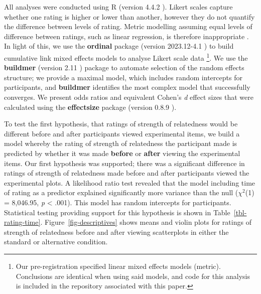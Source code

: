 \documentclass[manuscript,screen,review,anonymous]{acmart}
\begin{document}
All analyses were conducted using R (version 4.4.2 \citep{rcore}).
Likert scales capture whether one rating is higher or lower than
another, however they do not quantify the difference between levels of
rating. Metric modelling assuming equal levels of difference between
ratings, such as linear regression, is therefore inappropriate
\citep{liddell_2018}. In light of this, we use the \textbf{ordinal}
package (version 2023.12-4.1 \citep{ordinal}) to build cumulative link
mixed effects models to analyse Likert scale data \footnote{Our
  pre-registration specified linear mixed effects models (metric).
  Conclusions are identical when using said models, and code for this
  analysis is included in the repository associated with this paper.}.
We use the \textbf{buildmer} (version 2.11 \citep{buildmer}) package to
automate selection of the random effects structure; we provide a maximal
model, which includes random intercepts for participants, and
\textbf{buildmer} identifies the most complex model that successfully
converges. We present odds ratios and equivalent Cohen's \emph{d} effect
sizes that were calculated using the \textbf{effectsize} package
(version 0.8.9 \citep{effectsize}).

To test the first hypothesis, that ratings of strength of relatedness
would be different before and after participants viewed experimental
items, we build a model whereby the rating of strength of relatedness
the participant made is predicted by whether it was made \textbf{before}
or \textbf{after} viewing the experimental items. Our first hypothesis
was supported; there was a significant difference in ratings of strength
of relatedness made before and after participants viewed the
experimental plots. A likelihood ratio test revealed that the model
including time of rating as a predictor explained significantly more
variance than the null (\(\chi^2\)(1) = 8,046.95, \emph{p} \textless{}
.001). This model has random intercepts for participants. Statistical
testing providing support for this hypothesis is shown in
Table~\ref{tbl-rating-time}. Figure~\ref{fig-descriptives} shows means
and violin plots for ratings of strength of relatedness before and after
viewing scatterplots in either the standard or alternative condition.

\begin{table}

\caption{\label{tbl-rating-time}Statistics for the significant main
effect of rating time. Odds ratio and the equivalent Cohen's \textit{d}
value is also supplied.}


\end{table}%
\end{document}
